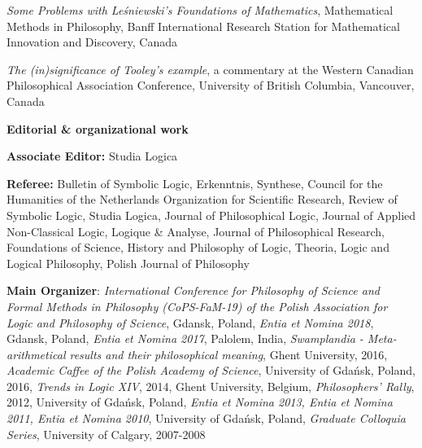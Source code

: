 \documentclass[10pt, a4paper]{article}
\newcommand{\years}[1]{\marginnote{\normalsize #1}}
\begin{document}
\vspace{0.5mm}


 \emph{Some Problems with Le\'sniewski's Foundations of Mathematics},  Mathematical  Methods in Philosophy,  Banff
International Research Station for Mathematical Innovation and Discovery, Canada


\vspace{0.5mm}


\years{2006} \emph{The (in)significance of Tooley's example}, a commentary at the   Western Canadian Philosophical Association Conference,  University of British Columbia, Vancouver, Canada


\vspace{0.5mm}



\vspace{2mm}

\large {\sc \textbf{Editorial \& organizational work}}\normalsize \hspace{5mm}


\normalsize


\textbf{Associate Editor:} Studia Logica

\textbf{Referee:} Bulletin of Symbolic Logic, Erkenntnis,  Synthese, Council for the Humanities of the Netherlands Organization for Scientific Research, Review of Symbolic Logic,  Studia Logica,  Journal of Philosophical Logic, Journal of Applied Non-Classical Logic,  Logique \& Analyse,   Journal of Philosophical Research,  Foundations of Science,  History and Philosophy of Logic, Theoria, Logic and Logical Philosophy, Polish Journal of Philosophy



\textbf{Main Organizer}: \emph{International Conference for Philosophy of Science and Formal Methods in Philosophy (CoPS-FaM-19) of the Polish Association for Logic and Philosophy of Science}, Gdansk, Poland, \emph{Entia et Nomina 2018}, Gdansk, Poland,  \emph{Entia et Nomina 2017}, Palolem, India, \emph{Swamplandia - Meta-arithmetical results and their philosophical meaning}, Ghent University, 2016, \emph{Academic Caffee of the Polish Academy of Science}, University of Gda{\'n}sk, Poland, 2016, \emph{Trends in Logic XIV}, 2014, Ghent University, Belgium, \emph{Philosophers' Rally}, 2012, University of Gda\' nsk, Poland, \emph{Entia et Nomina 2013, Entia et Nomina 2011, Entia et Nomina 2010}, University of Gda{\'n}sk, Poland,  \emph{Graduate Colloquia Series}, University of Calgary, 2007-2008







%
\end{document}
